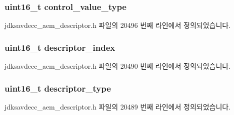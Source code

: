 \subsubsection[{\texorpdfstring{control\+\_\+value\+\_\+type}{control_value_type}}]{\setlength{\rightskip}{0pt plus 5cm}uint16\+\_\+t control\+\_\+value\+\_\+type}\hypertarget{structjdksavdecc__descriptor__matrix_a62a5b88a920cc4d09508de6fc60d9a63}{}\label{structjdksavdecc__descriptor__matrix_a62a5b88a920cc4d09508de6fc60d9a63}


jdksavdecc\+\_\+aem\+\_\+descriptor.\+h 파일의 20496 번째 라인에서 정의되었습니다.

\subsubsection[{\texorpdfstring{descriptor\+\_\+index}{descriptor_index}}]{\setlength{\rightskip}{0pt plus 5cm}uint16\+\_\+t descriptor\+\_\+index}\hypertarget{structjdksavdecc__descriptor__matrix_a042bbc76d835b82d27c1932431ee38d4}{}\label{structjdksavdecc__descriptor__matrix_a042bbc76d835b82d27c1932431ee38d4}


jdksavdecc\+\_\+aem\+\_\+descriptor.\+h 파일의 20490 번째 라인에서 정의되었습니다.

\subsubsection[{\texorpdfstring{descriptor\+\_\+type}{descriptor_type}}]{\setlength{\rightskip}{0pt plus 5cm}uint16\+\_\+t descriptor\+\_\+type}\hypertarget{structjdksavdecc__descriptor__matrix_ab7c32b6c7131c13d4ea3b7ee2f09b78d}{}\label{structjdksavdecc__descriptor__matrix_ab7c32b6c7131c13d4ea3b7ee2f09b78d}


jdksavdecc\+\_\+aem\+\_\+descriptor.\+h 파일의 20489 번째 라인에서 정의되었습니다.

